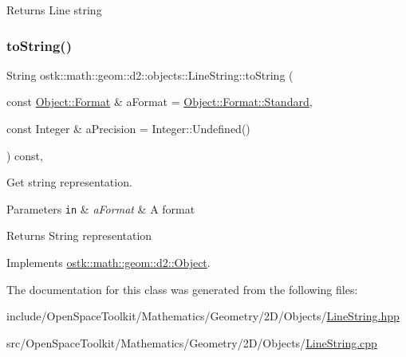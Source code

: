 \begin{DoxyReturn}{Returns}
Line string 
\end{DoxyReturn}
\mbox{\label{classostk_1_1math_1_1geom_1_1d2_1_1objects_1_1_line_string_a5312030bced48de68f8902bb6581461d}} 
\subsubsection{\texorpdfstring{to\+String()}{toString()}}
{\footnotesize\ttfamily String ostk\+::math\+::geom\+::d2\+::objects\+::\+Line\+String\+::to\+String (\begin{DoxyParamCaption}\item[{const \hyperlink{classostk_1_1math_1_1geom_1_1d2_1_1_object_aa76f9e30caebf4005bafbdff447f66cf}{Object\+::\+Format} \&}]{a\+Format = {\ttfamily \hyperlink{classostk_1_1math_1_1geom_1_1d2_1_1_object_aa76f9e30caebf4005bafbdff447f66cfaeb6d8ae6f20283755b339c0dc273988b}{Object\+::\+Format\+::\+Standard}},  }\item[{const Integer \&}]{a\+Precision = {\ttfamily Integer\+:\+:Undefined()} }\end{DoxyParamCaption}) const\hspace{0.3cm}{\ttfamily [override]}, {\ttfamily [virtual]}}



Get string representation. 


\begin{DoxyParams}[1]{Parameters}
\mbox{\tt in}  & {\em a\+Format} & A format \\
\hline
\end{DoxyParams}
\begin{DoxyReturn}{Returns}
String representation 
\end{DoxyReturn}


Implements \hyperlink{classostk_1_1math_1_1geom_1_1d2_1_1_object_ada4c2187dd24ef02b91b6346191f677c}{ostk\+::math\+::geom\+::d2\+::\+Object}.



The documentation for this class was generated from the following files\+:\begin{DoxyCompactItemize}
\item 
include/\+Open\+Space\+Toolkit/\+Mathematics/\+Geometry/2\+D/\+Objects/\hyperlink{2_d_2_objects_2_line_string_8hpp}{Line\+String.\+hpp}\item 
src/\+Open\+Space\+Toolkit/\+Mathematics/\+Geometry/2\+D/\+Objects/\hyperlink{2_d_2_objects_2_line_string_8cpp}{Line\+String.\+cpp}\end{DoxyCompactItemize}
